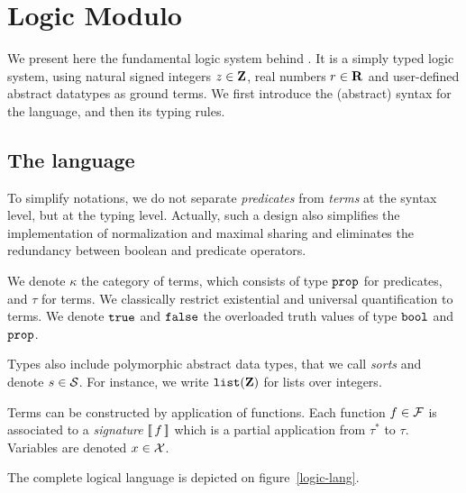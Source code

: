 \section{Logic Modulo}
\label{logic}

We present here the fundamental logic system behind \Qed. It is a
simply typed logic system, using natural signed integers $z\in\mathbf{Z}$,
real numbers $r\in\mathbf{R}$ and user-defined abstract datatypes as ground
terms. We first introduce the (abstract) syntax for the language, and
then its typing rules.

\subsection{The language}

To simplify notations, we do not separate \emph{predicates} from
\emph{terms} at the syntax level, but at the typing level.  Actually,
such a design also simplifies the implementation of normalization and
maximal sharing and eliminates the redundancy between boolean and
predicate operators. 

We denote $\kappa$ the category of terms, which consists of type
$\mathtt{prop}$ for predicates, and $\tau$ for terms. We classically restrict
existential and universal quantification to terms. We denote $\mathtt{true}$
and $\mathtt{false}$ the overloaded truth values of type $\mathtt{bool}$ and $\mathtt{prop}$.

Types also include polymorphic abstract data types, that we call \emph{sorts} and denote $s\in{\cal S}$. For instance, we write $\mathtt{list}(\mathbf{Z})$ for lists over integers.

Terms can be constructed by application of functions. Each function $f\in\cal F$ is associated to a \emph{signature} $[\![\,f\,]\!]$ which is a partial application from $\tau^*$ to $\tau$. Variables are denoted $x\in\cal X$.

The complete logical language is depicted on figure~\ref{logic-lang}.


